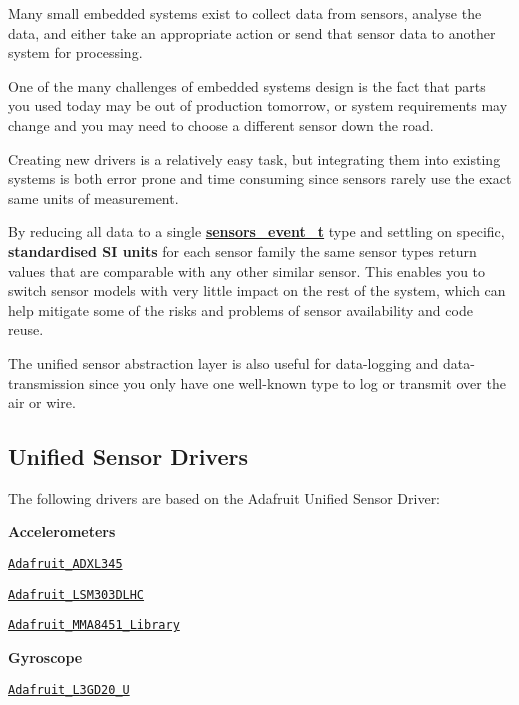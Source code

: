 Many small embedded systems exist to collect data from sensors, analyse the data, and either take an appropriate action or send that sensor data to another system for processing.

One of the many challenges of embedded systems design is the fact that parts you used today may be out of production tomorrow, or system requirements may change and you may need to choose a different sensor down the road.

Creating new drivers is a relatively easy task, but integrating them into existing systems is both error prone and time consuming since sensors rarely use the exact same units of measurement.

By reducing all data to a single {\bfseries \hyperlink{_adafruit___sensor_8h_structsensors__event__t}{sensors\+\_\+event\+\_\+t}} \textquotesingle{}type\textquotesingle{} and settling on specific, {\bfseries standardised SI units} for each sensor family the same sensor types return values that are comparable with any other similar sensor. This enables you to switch sensor models with very little impact on the rest of the system, which can help mitigate some of the risks and problems of sensor availability and code reuse.

The unified sensor abstraction layer is also useful for data-\/logging and data-\/transmission since you only have one well-\/known type to log or transmit over the air or wire.

\subsection*{Unified Sensor Drivers}

The following drivers are based on the Adafruit Unified Sensor Driver\+:

{\bfseries Accelerometers}
\begin{DoxyItemize}
\item \href{https://github.com/adafruit/Adafruit_ADXL345}{\tt Adafruit\+\_\+\+A\+D\+X\+L345}
\item \href{https://github.com/adafruit/Adafruit_LSM303DLHC}{\tt Adafruit\+\_\+\+L\+S\+M303\+D\+L\+HC}
\item \href{https://github.com/adafruit/Adafruit_MMA8451_Library}{\tt Adafruit\+\_\+\+M\+M\+A8451\+\_\+\+Library}
\end{DoxyItemize}

{\bfseries Gyroscope}
\begin{DoxyItemize}
\item \href{https://github.com/adafruit/Adafruit_L3GD20_U}{\tt Adafruit\+\_\+\+L3\+G\+D20\+\_\+U}
\end{DoxyItemize}

